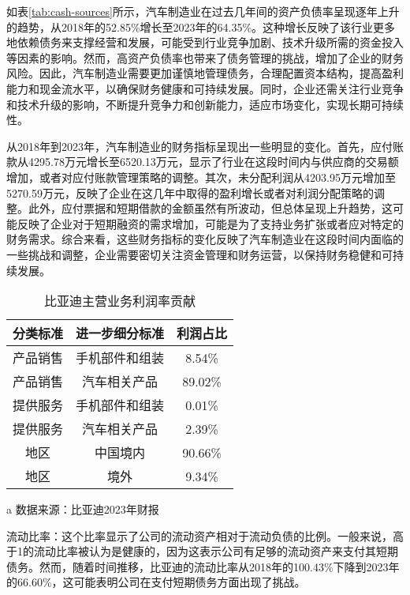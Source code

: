 如表\eqref{tab:cash-sources}所示，汽车制造业在过去几年间的资产负债率呈现逐年上升的趋势，从2018年的52.85\%增长至2023年的64.35\%。这种增长反映了该行业更多地依赖债务来支撑经营和发展，可能受到行业竞争加剧、技术升级所需的资金投入等因素的影响。然而，高资产负债率也带来了债务管理的挑战，增加了企业的财务风险。因此，汽车制造业需要更加谨慎地管理债务，合理配置资本结构，提高盈利能力和现金流水平，以确保财务健康和可持续发展。同时，企业还需关注行业竞争和技术升级的影响，不断提升竞争力和创新能力，适应市场变化，实现长期可持续性。

从2018年到2023年，汽车制造业的财务指标呈现出一些明显的变化。首先，应付账款从4295.78万元增长至6520.13万元，显示了行业在这段时间内与供应商的交易额增加，或者对应付账款管理策略的调整。其次，未分配利润从4203.95万元增加至5270.59万元，反映了企业在这几年中取得的盈利增长或者对利润分配策略的调整。此外，应付票据和短期借款的金额虽然有所波动，但总体呈现上升趋势，这可能反映了企业对于短期融资的需求增加，可能是为了支持业务扩张或者应对特定的财务需求。综合来看，这些财务指标的变化反映了汽车制造业在这段时间内面临的一些挑战和调整，企业需要密切关注资金管理和财务运营，以保持财务稳健和可持续发展。

\begin{table}
  \centering
  \begin{threeparttable}[c]
    \caption{比亚迪主营业务利润率贡献}
    \label{tab:profits-rates}
    \begin{tabular}{ccc}
      \toprule
        分类标准 & 进一步细分标准 & 利润占比 \\ 
      \midrule
        产品销售 & 手机部件和组装 & 8.54\% \\ 
        产品销售 & 汽车相关产品 & 89.02\% \\ 
        提供服务 & 手机部件和组装 & 0.01\% \\ 
        提供服务 & 汽车相关产品 & 2.39\% \\ 
        地区 & 中国境内 & 90.66\% \\ 
        地区 & 境外 & 9.34\% \\ 
      \bottomrule
    \end{tabular}
    \begin{tablenotes}
      \item [a] 数据来源：比亚迪2023年财报
    \end{tablenotes}
  \end{threeparttable}
\end{table}


流动比率：这个比率显示了公司的流动资产相对于流动负债的比例。一般来说，高于1的流动比率被认为是健康的，因为这表示公司有足够的流动资产来支付其短期债务。然而，随着时间推移，比亚迪的流动比率从2018年的100.43\%下降到2023年的66.60\%，这可能表明公司在支付短期债务方面出现了挑战。

